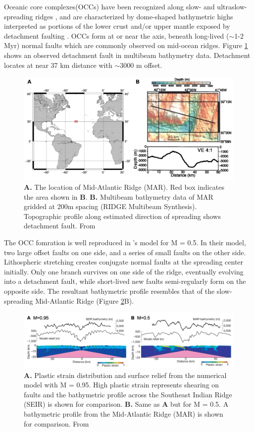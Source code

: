 \documentclass[letterpaper,12pt,notitle]{memphisthesis}                     %
\begin{document}
Oceanic core complexes(OCCs) have been recognized along slow- and ultraslow- spreading ridges \citep{Tucholke1998}, and are characterized by dome-shaped bathymetric highs interpreted as portions of the lower crust and/or upper mantle exposed by detachment faulting \citep{Tucholke1994}. OCCs form at or near the axis, beneath long-lived ($\sim$1-2 Myr) normal faults which are commonly observed on mid-ocean ridges. Figure \ref{fig:occ} shows an observed detachment fault in multibeam bathymetry data. Detachment locates at near 37 km distance with $\sim$3000 m offset.
%
\begin{figure}[!htb]
	\centering
	\includegraphics[width=0.9\linewidth]{./figs/occ.png}
	\caption{\textbf{A.} The location of Mid-Atlantic Ridge (MAR). Red box indicates the area shown in \textbf{B}. \textbf{B.} Multibeam bathymetry data of MAR gridded at 200m spacing (RIDGE Multibeam Synthesis). Topographic profile along estimated direction of spreading shows detachment fault. From \citet{Lavier2000}}
	\label{fig:occ}
\end{figure}
%
The OCC fomration is well reproduced in \citet{Buck2005}'s model for M = 0.5. In their model,  two large offset faults on one side, and a series of small faults on the other side. Lithospheric stretching creates conjugate normal faults at the spreading center initially. Only one branch survives on one side of the ridge, eventually evolving into a detachment fault, while short-lived new faults semi-regularly form on the opposite side. The resultant bathymetric profile resembles that of the slow-spreading Mid-Atlantic Ridge (Figure \ref{fig:mfactor}B).
%
\begin{figure}[!htb]
	\centering
	\includegraphics[width=0.99\linewidth]{./figs/fig1.png}
	\caption{\textbf{A.} Plastic strain distribution and surface relief from the numerical model with M = 0.95. High plastic strain represents shearing on faults and the bathymetric profile across the Southeast Indian Ridge (SEIR) is shown for comparison. \textbf{B.} Same as \textbf{A} but for M = 0.5. A bathymetric profile from the Mid-Atlantic Ridge (MAR) is shown for comparison. From \citet{Buck2005}}
	\label{fig:mfactor}
\end{figure}
\end{document}
